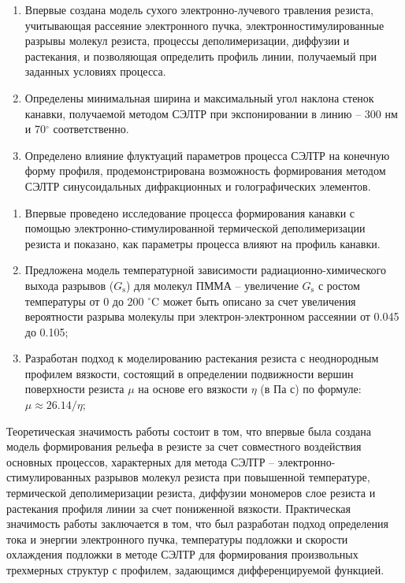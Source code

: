 
\begin{enumerate}
	\item Впервые создана модель сухого электронно-лучевого травления резиста, учитывающая рассеяние электронного пучка, электронностимулированные разрывы молекул резиста, процессы деполимеризации, диффузии и растекания, и позволяющая определить профиль линии, получаемый при заданных условиях процесса.
	\item Определены минимальная ширина и максимальный угол наклона стенок канавки, получаемой методом СЭЛТР при экспонировании в линию -- 300 нм и 70$^\circ$ соответственно.
	\item Определено влияние флуктуаций параметров процесса СЭЛТР на конечную форму профиля, продемонстрирована возможность формирования методом СЭЛТР синусоидальных дифракционных и голографических элементов.
\end{enumerate}


\novelty

\begin{enumerate}
	\item Впервые проведено исследование процесса формирования канавки с помощью электронно-стимулированной термической деполимеризации резиста и показано, как параметры процесса влияют на профиль канавки.
	\item Предложена модель температурной зависимости радиационно-химического выхода разрывов ($G_\mathrm{s}$) для молекул ПММА -- увеличение $G_\mathrm{s}$ с ростом температуры от 0 до 200 $^\circ$C может быть описано за счет увеличения вероятности разрыва молекулы при электрон-электронном рассеянии от 0.045 до 0.105;
	\item Разработан подход к моделированию растекания резиста с неоднородным профилем вязкости, состоящий в определении подвижности вершин поверхности резиста $\mu$ на основе его вязкости $\eta$ (в Па с) по формуле: $\mu \approx 26.14 / \eta$;
\end{enumerate}


\influence

Теоретическая значимость работы состоит в том, что впервые была создана модель формирования рельефа в резисте за счет совместного воздействия основных процессов, характерных для метода СЭЛТР -- электронно-стимулированных разрывов молекул резиста при повышенной температуре, термической деполимеризации резиста, диффузии мономеров слое резиста и растекания профиля линии за счет пониженной вязкости.
Практическая значимость работы заключается в том, что был разработан подход определения тока и энергии электронного пучка, температуры подложки и скорости охлаждения подложки в методе СЭЛТР для формирования произвольных трехмерных структур с профилем, задающимся дифференцируемой функцией.


